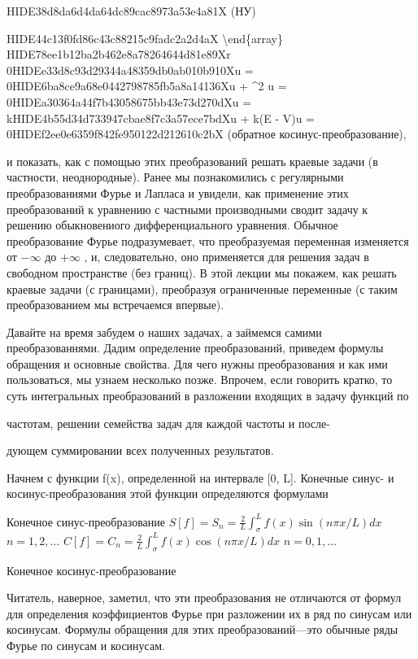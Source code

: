 \documentclass[
  ukrainian,
]{article}
\begin{document}
HIDE38d8da6d4da64dc89cac8973a53e4a81X (НУ)

HIDE44c13f0fd86c43c88215c9fadc2a2d4aX \textbackslash end\{array\}
HIDE78ee1b12ba2b462e8a78264644d81e89Xr
\geqslant 0HIDEe33d8c93d29344a48359db0ab010b910X\Delta u =
0HIDE6ba8ce9a68e0442798785fb5a8a14136X\Delta u + \lambda\^{}2 u =
0HIDEa30364a44f7b43058675bb43e73d270dX\Delta u =
kHIDE4b55d34d733947cbae8f7c3a57ece7bdX\Delta u + k(E - V)u =
0HIDEf2ee0e6359f842fe950122d212610c2bX (обратное
косинус-преобразование),

и показать, как с помощью этих преобразований решать краевые задачи (в
частности, неоднородные). Ранее мы познакомились с регулярными
преобразованиями Фурье и Лапласа и увидели, как применение этих
преобразований к уравнению с частными производными сводит задачу к
решению обыкновениого дифференциального уравнения. Обычное
преобразование Фурье подразумевает, что преобразуемая переменная
изменяется от \(-\infty\) до \(+\infty\) , и, следовательно, оно
применяется для решения задач в свободном пространстве (без границ). В
этой лекции мы покажем, как решать краевые задачи (с границами),
преобразуя ограниченные переменные (с таким преобразованием мы
встречаемся впервые).

Давайте на время забудем о наших задачах, а займемся самими
преобразованнями. Дадим определение преобразований, приведем формулы
обращения и основные свойства. Для чего нужны преобразования и как ими
пользоваться, мы узнаем несколько позже. Впрочем, если говорить кратко,
то суть интегральных преобразований в разложении входящих в задачу
функций по

частотам, решении семейства задач для каждой частоты и после-

дующем суммировании всех полученных результатов.

Начнем с функции f(x), определенной на интервале {[}0, L{]}. Конечные
синус- и косинус-преобразования этой функции определяются формулами

Конечное синус-преобразование
\(S[f] = S_n = \frac{2}{L} \int_{\sigma}^{L} f(x) \sin(n\pi x/L) dx\)
\(n = 1, 2, \dots\)
\(C[f] = C_n = \frac{2}{L} \int_{\sigma}^{L} f(x) \cos(n\pi x/L) dx\)
\(n = 0, 1, \dots\)

Конечное косинус-преобразование

Читатель, наверное, заметил, что эти преобразования не отличаются от
формул для определения коэффициентов Фурье при разложении их в ряд по
синусам или косинусам. Формулы обращения для этих преобразований---это
обычные ряды Фурье по синусам и косинусам.
\end{document}
